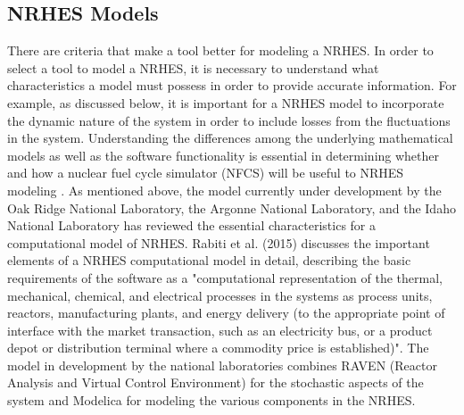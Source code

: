 \documentclass{article}                                                                           %
\begin{document}
\begin{linenumbers}
\section{NRHES Models}
There are criteria that make a tool better for modeling a NRHES. In order to select a tool to model a NRHES, it is necessary to understand what characteristics a model must possess in order to provide accurate information. For example, as discussed below, it is important for a NRHES model to incorporate the dynamic nature of the system in order to include losses from the fluctuations in the system. Understanding the differences among the underlying mathematical models as well as the software functionality is essential in determining whether and how a nuclear fuel cycle simulator (NFCS) will be useful to NRHES modeling . 
As mentioned above, the model currently under development by the Oak Ridge National Laboratory, the Argonne National Laboratory, and the Idaho National Laboratory has reviewed the essential characteristics for a computational model of NRHES. Rabiti et al. (2015) discusses the important elements of a NRHES computational model in detail, describing the basic requirements of the software as a "computational representation of the thermal, mechanical, chemical, and electrical processes in the systems as process units, reactors, manufacturing plants, and energy delivery (to the appropriate point of interface with the market transaction, such as an electricity bus, or a product depot or distribution terminal where a commodity price is established)"\cite{Rabiti2015}. The model in development by the national laboratories combines RAVEN (Reactor Analysis and Virtual Control Environment) for the stochastic aspects of the system and Modelica for modeling the various components in the NRHES. 


\end{linenumbers}
\end{document}
